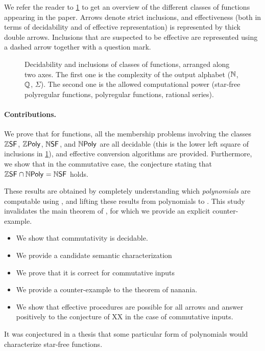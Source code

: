 We refer the reader to \cref{previously-known-inclusions:fig} to get an
overview of the different classes of functions appearing in the paper. Arrows
denote strict inclusions, and effectiveness (both in terms of decidability and
of effective representation) is represented by thick double arrows. Inclusions
that are suspected to be effective are represented using a dashed arrow
together with a question mark.


\begin{figure}
    
    \caption{
        Decidability and inclusions of classes of functions,
        arranged along two axes. The first one is the complexity
        of the output alphabet ($\mathbb{N}$, $\mathbb{Q}$, $\Sigma$). The second
        one is the allowed computational power
        (star-free polyregular functions, polyregular functions, 
        rational series).
    }
    \label{previously-known-inclusions:fig}
\end{figure}


\paragraph{Contributions.} We prove that for  functions, all
the membership problems involving the classes $\ZSF$, $\ZPoly$, $\NSF$, and
$\NPoly$ are all decidable (this is the lower left square of inclusions in
\cref{previously-known-inclusions:fig}), and effective conversion algorithms
are provided. Furthermore, we show that in the commutative case, the conjecture
stating that $\ZSF \cap \NPoly = \NSF$ holds. 

These results are obtained by completely understanding which \emph{polynomials}
are computable using , and lifting these
results from polynomials to . This study
invalidates the main theorem of \cite{KARH77}, for which we provide an explicit
counter-example. 



\begin{itemize}
    \item We show that commutativity is decidable.
    \item We provide a candidate semantic characterization
    \item We prove that it is correct for commutative inputs
    \item We provide a counter-example to the theorem of nanania.
    \item We show that effective procedures are possible for all arrows 
        and answer positively to the conjecture of XX
        in the case of commutative inputs.
\end{itemize}
It was conjectured in a thesis that some particular form of polynomials
would characterize star-free functions.

